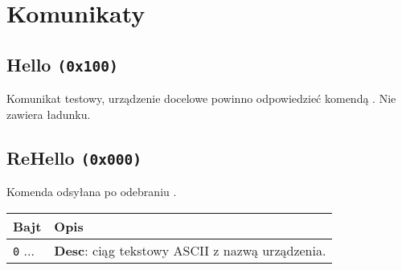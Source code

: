 \newpage

\section{Komunikaty}
\label{Sec_komunikaty}

\subsection{Hello \texttt{(0x100)}}
\label{hello}
Komunikat testowy, urządzenie docelowe powinno odpowiedzieć komendą . Nie zawiera ładunku.

\subsection{ReHello \texttt{(0x000)}}
\label{reHello}
Komenda odsyłana po odebraniu .
\begin{longtable}{|p{}|p{}|}
	\hline
	\textbf{Bajt} & \textbf{Opis}\\ 
	\hline
	\hline
	\texttt{0} ... & \textbf{Desc}: ciąg tekstowy ASCII z nazwą urządzenia.\\
	\hline
\end{longtable}